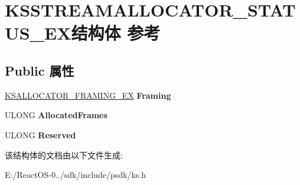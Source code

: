 \hypertarget{struct_k_s_s_t_r_e_a_m_a_l_l_o_c_a_t_o_r___s_t_a_t_u_s___e_x}{}\section{K\+S\+S\+T\+R\+E\+A\+M\+A\+L\+L\+O\+C\+A\+T\+O\+R\+\_\+\+S\+T\+A\+T\+U\+S\+\_\+\+E\+X结构体 参考}
\label{struct_k_s_s_t_r_e_a_m_a_l_l_o_c_a_t_o_r___s_t_a_t_u_s___e_x}
\subsection*{Public 属性}
\begin{DoxyCompactItemize}
\item 
\mbox{\label{struct_k_s_s_t_r_e_a_m_a_l_l_o_c_a_t_o_r___s_t_a_t_u_s___e_x_a6b764d698dfff66935a580b259b67c29}} 
\hyperlink{struct_k_s_a_l_l_o_c_a_t_o_r___f_r_a_m_i_n_g___e_x}{K\+S\+A\+L\+L\+O\+C\+A\+T\+O\+R\+\_\+\+F\+R\+A\+M\+I\+N\+G\+\_\+\+EX} {\bfseries Framing}
\item 
\mbox{\label{struct_k_s_s_t_r_e_a_m_a_l_l_o_c_a_t_o_r___s_t_a_t_u_s___e_x_ad9b450ac03cbc84645f5302d138f2150}} 
U\+L\+O\+NG {\bfseries Allocated\+Frames}
\item 
\mbox{\label{struct_k_s_s_t_r_e_a_m_a_l_l_o_c_a_t_o_r___s_t_a_t_u_s___e_x_ae8129d118b651edc3bceb003931dae46}} 
U\+L\+O\+NG {\bfseries Reserved}
\end{DoxyCompactItemize}


该结构体的文档由以下文件生成\+:\begin{DoxyCompactItemize}
\item 
E\+:/\+React\+O\+S-\/0../sdk/include/psdk/ks.\+h\end{DoxyCompactItemize}
